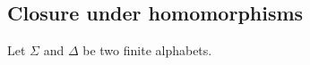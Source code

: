 

\setcounter{section}{3}
\setcounter{subsection}{3}
\setcounter{dfn}{7}

\subsection{Closure under homomorphisms}
Let $\Sigma$ and $\Delta$ be two finite alphabets.


